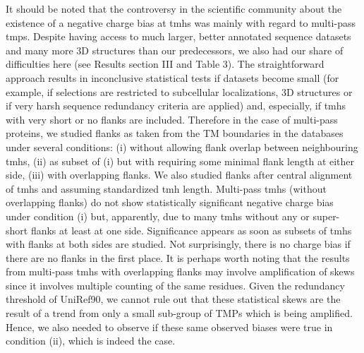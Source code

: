 It should be noted that the controversy in the scientific community about the existence of a negative charge bias at \gls{tmh}s was mainly with regard to multi-pass \gls{tmp}s. Despite having access to much larger, better annotated sequence datasets and many more 3D structures than our predecessors, we also had our share of difficulties here (see Results section III and Table 3). The straightforward approach results in inconclusive statistical tests if datasets become small (for example, if selections are restricted to subcellular localizations, 3D structures or if very harsh sequence redundancy criteria are applied) and, especially, if \gls{tmh}s with very short or no flanks are included. Therefore in the case of multi-pass proteins, we studied flanks as taken from the TM boundaries in the databases under several conditions: (i) without allowing flank overlap between neighbouring \gls{tmh}s, (ii) as subset of (i) but with requiring some minimal flank length at either side, (iii) with overlapping flanks. We also studied flanks after central alignment of \gls{tmh}s and assuming standardized \gls{tmh} length. Multi-pass \gls{tmh}s (without overlapping flanks) do not show statistically significant negative charge bias under condition (i) but, apparently, due to many \gls{tmh}s without any or super-short flanks at least at one side. Significance appears as soon as subsets of \gls{tmh}s with flanks at both sides are studied. Not surprisingly, there is no charge bias if there are no flanks in the first place. It is perhaps worth noting that the results from multi-pass \gls{tmh}s with overlapping flanks may involve amplification of skews since it involves multiple counting of the same residues. Given the redundancy threshold of UniRef90, we cannot rule out that these statistical skews are the result of a trend from only a small sub-group of TMPs which is being amplified. Hence, we also needed to observe if these same observed biases were true in condition (ii), which is indeed the case.

